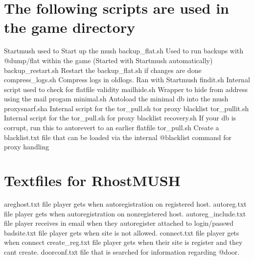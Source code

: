 \documentclass[letterpaper,10pt,english]{sphinxmanual}
\begin{document}
\section{The following scripts are used in the game directory}
\label{\detokenize{maintenance:the-following-scripts-are-used-in-the-game-directory}}
\sphinxAtStartPar
Startmush               \sphinxhyphen{}\sphinxhyphen{} used to Start up the mush
backup\_flat.sh          \sphinxhyphen{}\sphinxhyphen{} Used to run backups with @dump/flat within the game (Started with Startmush automatically)
backup\_restart.sh       \sphinxhyphen{}\sphinxhyphen{} Restart the backup\_flat.sh if changes are done
compress\_logs.sh        \sphinxhyphen{}\sphinxhyphen{} Compress logs in \textquotesingle{}oldlogs\textquotesingle{}.  Ran with Startmush
findit.sh               \sphinxhyphen{}\sphinxhyphen{} Internal script used to check for flatfile validity
mailhide.sh             \sphinxhyphen{}\sphinxhyphen{} Wrapper to hide from address using the \textquotesingle{}mail\textquotesingle{} progam
minimal.sh              \sphinxhyphen{}\sphinxhyphen{} Auto\sphinxhyphen{}load the minimal db into the mush
proxysnarf.sha          \sphinxhyphen{}\sphinxhyphen{} Internal script for the tor\_pull.sh tor proxy blacklist
tor\_pullit.sh           \sphinxhyphen{}\sphinxhyphen{} Internal script for the tor\_pull.sh for proxy blacklist
recovery.sh             \sphinxhyphen{}\sphinxhyphen{} If your db is corrupt, run this to auto\sphinxhyphen{}revert to an earlier flatfile
tor\_pull.sh             \sphinxhyphen{}\sphinxhyphen{} Create a blacklist.txt file that can be loaded via the internal @blacklist command for proxy handling


\section{Textfiles for RhostMUSH}
\label{\detokenize{maintenance:textfiles-for-rhostmush}}
\sphinxAtStartPar
areghost.txt           \sphinxhyphen{} file player gets when autoregistration on registered host.
autoreg.txt            \sphinxhyphen{} file player gets when autoregistration on non\sphinxhyphen{}registered host.
autoreg\_include.txt    \sphinxhyphen{} file player receives in email when they autoregister attached to login/passwd
badsite.txt            \sphinxhyphen{} file player gets when site is not allowed.
connect.txt            \sphinxhyphen{} file player gets when connect
create\_reg.txt         \sphinxhyphen{} file player gets when their site is register and they can\textquotesingle{}t create.
doorconf.txt           \sphinxhyphen{} file that is searched for information regarding @door.
\end{document}
